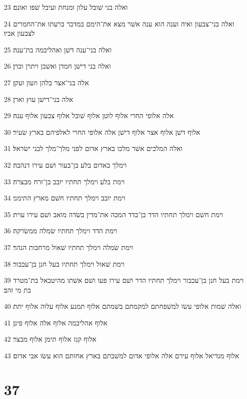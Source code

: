 \par 23 ואלה בני שׁובל עלון ומנחת ועיבל שׁפו ואונם׃
\par 24 ואלה בני־צבעון ואיה וענה הוא ענה אשׁר מצא את־הימם במדבר ברעתו את־החמרים לצבעון אביו׃
\par 25 ואלה בני־ענה דשׁן ואהליבמה בת־ענה׃
\par 26 ואלה בני דישׁן חמדן ואשׁבן ויתרן וכרן׃
\par 27 אלה בני־אצר בלהן וזעון ועקן׃
\par 28 אלה בני־דישׁן עוץ וארן׃
\par 29 אלה אלופי החרי אלוף לוטן אלוף שׁובל אלוף צבעון אלוף ענה׃
\par 30 אלוף דשׁן אלוף אצר אלוף דישׁן אלה אלופי החרי לאלפיהם בארץ שׂעיר׃
\par 31 ואלה המלכים אשׁר מלכו בארץ אדום לפני מלך־מלך לבני ישׂראל׃
\par 32 וימלך באדום בלע בן־בעור ושׁם עירו דנהבה׃
\par 33 וימת בלע וימלך תחתיו יובב בן־זרח מבצרה׃
\par 34 וימת יובב וימלך תחתיו חשׁם מארץ התימני׃
\par 35 וימת חשׁם וימלך תחתיו הדד בן־בדד המכה את־מדין בשׂדה מואב ושׁם עירו עוית׃
\par 36 וימת הדד וימלך תחתיו שׂמלה ממשׂרקה׃
\par 37 וימת שׂמלה וימלך תחתיו שׁאול מרחבות הנהר׃
\par 38 וימת שׁאול וימלך תחתיו בעל חנן בן־עכבור׃
\par 39 וימת בעל חנן בן־עכבור וימלך תחתיו הדר ושׁם עירו פעו ושׁם אשׁתו מהיטבאל בת־מטרד בת מי זהב׃
\par 40 ואלה שׁמות אלופי עשׂו למשׁפחתם למקמתם בשׁמתם אלוף תמנע אלוף עלוה אלוף יתת׃
\par 41 אלוף אהליבמה אלוף אלה אלוף פינן׃
\par 42 אלוף קנז אלוף תימן אלוף מבצר׃
\par 43 אלוף מגדיאל אלוף עירם אלה אלופי אדום למשׁבתם בארץ אחזתם הוא עשׂו אבי אדום׃

\chapter{37}

